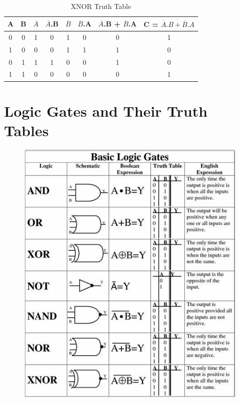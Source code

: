 \documentclass{article}
\begin{document}
						\begin{table}[h!]
							\centering
							\caption{XNOR Truth Table}
							\label{tab 3: XNOR table}
							\begin{tabular}{|c|c|c|c|c|c|c|c|}
								
							\rowcolor{blue!60}	A & B & $\overline{A}$ & $\overline{A}$.B & $\overline{B}$ & $\overline{B}$.A & $\overline{A}$.B + $\overline{B}$.A & C = $\overline{\overline{A}.B + \overline{B}.A}$  \\
								\hline
							\rowcolor{blue!10}	0 & 0 & 1 & 0 & 1 & 0 & 0 & 1\\
							\rowcolor{blue!20}	1 & 0 & 0 & 0 & 1 & 1 & 1 & 0\\
							\rowcolor{blue!10}	0 & 1 & 1 & 1 & 0 & 0 & 1 & 0\\
							\rowcolor{blue!20}	1 & 1 & 0 & 0 & 0 & 0 & 0 & 1 \\ \hline
								
							\end{tabular}
						\end{table}
		\newpage
		\section{Logic Gates and Their Truth Tables}
			\begin{figure}[h!]
				\includegraphics[width=1\linewidth]{pictures/Logic gate and truth table.jpg }
				\cite{picture}
			\end{figure}
		\newpage
\end{document}
